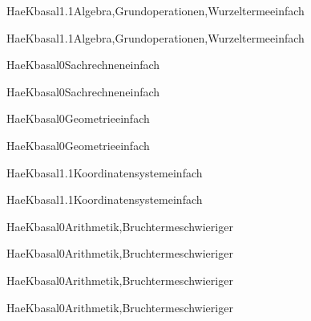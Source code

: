 \documentclass[12pt]{article}
\begin{document}
\begin{Add}{HaeK}{basal1.1}{Algebra,Grundoperationen,Wurzelterme}{einfach}
\solution{ }
\end{Add}
\begin{Add}{HaeK}{basal1.1}{Algebra,Grundoperationen,Wurzelterme}{einfach}
\end{Add}

\begin{Add}{HaeK}{basal0}{Sachrechnen}{einfach}
\solution{ }
\end{Add}
\begin{Add}{HaeK}{basal0}{Sachrechnen}{einfach}
\end{Add}

\begin{Add}{HaeK}{basal0}{Geometrie}{einfach}
\solution{ }
\end{Add}
\begin{Add}{HaeK}{basal0}{Geometrie}{einfach}
\end{Add}

\begin{Add}{HaeK}{basal1.1}{Koordinatensystem}{einfach}
\solution{ }
\end{Add}
\begin{Add}{HaeK}{basal1.1}{Koordinatensystem}{einfach}
\end{Add}

\begin{Add}{HaeK}{basal0}{Arithmetik,Bruchterme}{schwieriger}
\solution{ }
\end{Add}
\begin{Add}{HaeK}{basal0}{Arithmetik,Bruchterme}{schwieriger}
\end{Add}

\begin{Add}{HaeK}{basal0}{Arithmetik,Bruchterme}{schwieriger}
\solution{ }
\end{Add}
\begin{Add}{HaeK}{basal0}{Arithmetik,Bruchterme}{schwieriger}
\end{Add}
\end{document}
